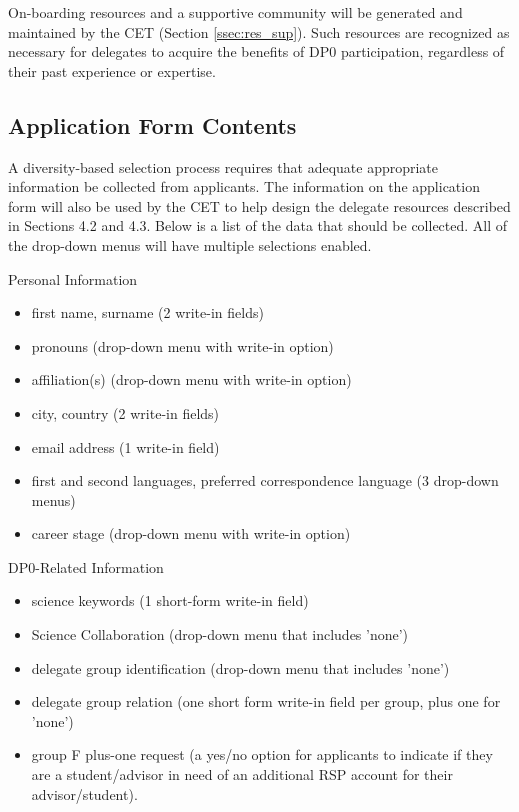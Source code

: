 \documentclass[DM,authoryear,toc]{lsstdoc}
\begin{document}
On-boarding resources and a supportive community will be generated and maintained by the CET (Section \ref{ssec:res_sup}).
Such resources are recognized as necessary for delegates to acquire the benefits of DP0 participation, regardless of their past experience or expertise. 

\subsection{Application Form Contents}\label{ssec:sel_form}

A diversity-based selection process requires that adequate appropriate information be collected from applicants.
The information on the application form will also be used by the CET to help design the delegate resources described in Sections 4.2 and 4.3. 
Below is a list of the data that should be collected.
All of the drop-down menus will have multiple selections enabled.

Personal Information
\begin{itemize}
\item first name, surname (2 write-in fields)
\item pronouns (drop-down menu with write-in option)
\item affiliation(s) (drop-down menu with write-in option)
\item city, country (2 write-in fields)
\item email address (1 write-in field)
\item first and second languages, preferred correspondence language (3 drop-down menus)
\item career stage (drop-down menu with write-in option)
\end{itemize}

DP0-Related Information
\begin{itemize}
\item science keywords (1 short-form write-in field)
\item Science Collaboration (drop-down menu that includes 'none')
\item delegate group identification (drop-down menu that includes 'none')
\item delegate group relation (one short form write-in field per group, plus one for 'none')
\item group F plus-one request (a yes/no option for applicants to indicate if they are a student/advisor in need of an additional RSP account for their advisor/student).
\end{itemize}
\end{document}
